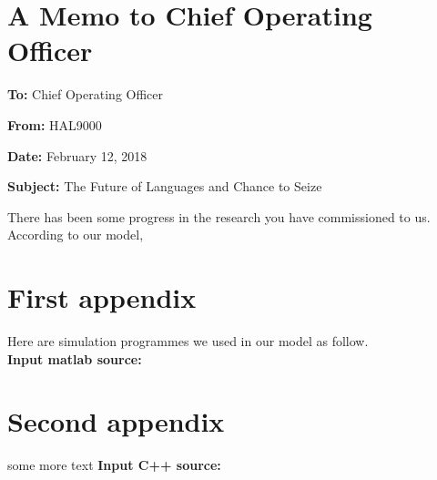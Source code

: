 \documentclass{mcmthesis}
\begin{document}
\section{A Memo to Chief Operating Officer}
\noindent\textbf{To:} Chief Operating Officer

\noindent\textbf{From:} HAL9000

\noindent\textbf{Date:} February 12, 2018

\noindent\textbf{Subject:} The Future of Languages and Chance to Seize

\noindent There has been some progress in the research you have commissioned to us. According to our model, 









\begin{appendices}

\section{First appendix}


Here are simulation programmes we used in our model as follow.\\

\textbf{\textcolor[rgb]{0.98,0.00,0.00}{Input matlab source:}}


\section{Second appendix}

some more text \textcolor[rgb]{0.98,0.00,0.00}{\textbf{Input C++ source:}}


\end{appendices}
\end{document}
